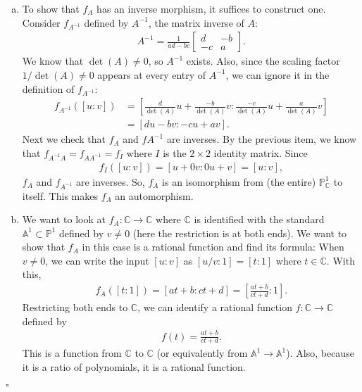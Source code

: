\documentclass[12pt]{article}
\newcommand{\A}{\mathbb{A}}
\newcommand{\C}{\mathbb{C}}
\newcommand{\f}[2]{\frac{#1}{#2}}
\begin{document}
\begin{enumerate}[(a)]
	\item To show that $f_A$ has an inverse morphism, it suffices to construct one. Consider $f_{A^{-1}}$ defined by $A^{-1}$, the matrix inverse of $A$:
	\begin{align*}
	A^{-1} = 
	\f{1}{ad-bc}\begin{bmatrix}
	d & -b \\ -c & a
	\end{bmatrix}.
	\end{align*}
	We know that $\det(A) \neq 0$, so $A^{-1}$ exists. Also, since the scaling factor $1/\det(A) \neq 0$ appears at every entry of $A^{-1}$, we can ignore it in the definition of $f_{A^{-1}}$:
	\begin{align*}
	f_{A^{-1}}([u:v]) &= \left[\f{d}{\det(A)}u + \f{-b}{\det(A)}v : \f{-c}{\det(A)}u + \f{a}{\det(A)}v \right] \\
	&= [du-bv : -cu+av].
	\end{align*}
	Next we check that $f_{A}$ and $f{A^{-1}}$ are inverses. By the previous item, we know that $f_{A^{-1}A} = f_{AA^{-1}} = f_{I}$ where $I$ is the $2\times 2$ identity matrix. Since 
	\begin{align*}
	f_I([u:v]) = [u + 0v : 0u+v] = [u:v],
	\end{align*} 
	$f_{A}$ and $f_{A^{-1}}$ are inverses. So, $f_{A}$ is an isomorphism from (the entire) $\mathbb{P}^1_{\mathbb{C}}$ to itself. This makes $f_A$ an automorphism. 
	
	
	
	\item We want to look at $f_A : \C \to \C$ where $\mathbb{C}$ is identified with the standard $\A^1 \subset \mathbb{P}^1$ defined by $v\neq 0$ (here the restriction is at both ends). We want to show that $f_A$ in this case is a rational function and find its formula: When $v\neq 0$, we can write the input $[u:v]$ as $[u/v:1] = [t:1]$ where $t\in \mathbb{C}$. With this, 
	\begin{align*}
	f_A([t:1]) = [at+b : ct+d] = \left[\f{at+b}{ct+d} : 1\right].
	\end{align*} 	 
	Restricting both ends to $\C$, we can identify a rational function $f: \mathbb{C} \to \mathbb{C}$ defined by
	\begin{align*}
	f(t) = \f{at+b}{ct+d}.
	\end{align*}
	This is a function from $\C$ to $\C$ (or equivalently from $\A^1 \to \A^1$). Also, because it is a ratio of polynomials, it is a rational function. 
\end{enumerate}
\hfill $\square$
\end{document}
